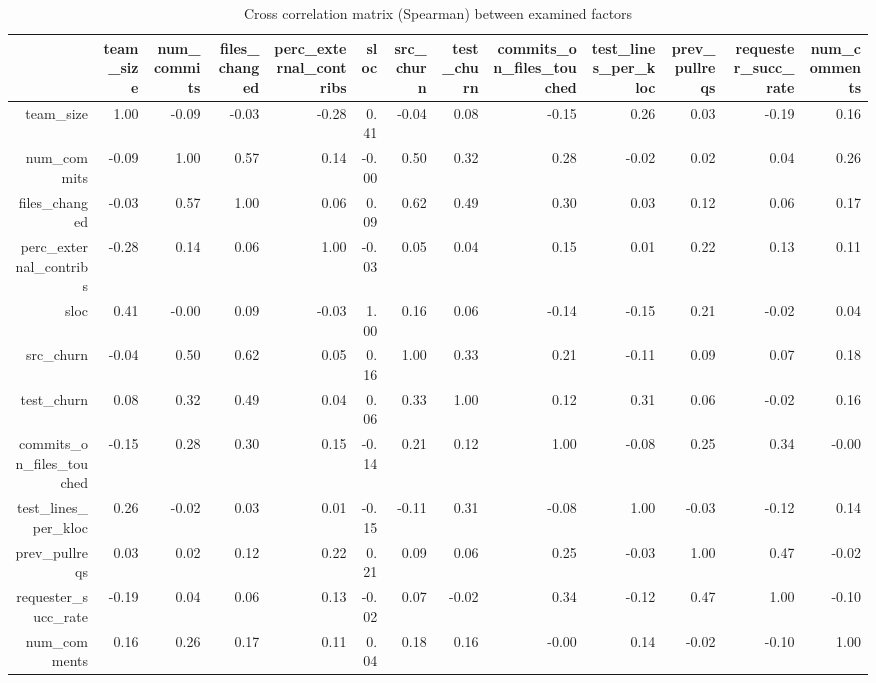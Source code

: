 \begin{table}[ht]
\centering
{\small
\begin{tabular}{rrrrrrrrrrrrr}
  \hline
 & team\_size & num\_commits & files\_changed & perc\_external\_contribs & sloc & src\_churn & test\_churn & commits\_on\_files\_touched & test\_lines\_per\_kloc & prev\_pullreqs & requester\_succ\_rate & num\_comments \\ 
  \hline
team\_size & 1.00 & -0.09 & -0.03 & -0.28 & 0.41 & -0.04 & 0.08 & -0.15 & 0.26 & 0.03 & -0.19 & 0.16 \\ 
  num\_commits & -0.09 & 1.00 & 0.57 & 0.14 & -0.00 & 0.50 & 0.32 & 0.28 & -0.02 & 0.02 & 0.04 & 0.26 \\ 
  files\_changed & -0.03 & 0.57 & 1.00 & 0.06 & 0.09 & 0.62 & 0.49 & 0.30 & 0.03 & 0.12 & 0.06 & 0.17 \\ 
  perc\_external\_contribs & -0.28 & 0.14 & 0.06 & 1.00 & -0.03 & 0.05 & 0.04 & 0.15 & 0.01 & 0.22 & 0.13 & 0.11 \\ 
  sloc & 0.41 & -0.00 & 0.09 & -0.03 & 1.00 & 0.16 & 0.06 & -0.14 & -0.15 & 0.21 & -0.02 & 0.04 \\ 
  src\_churn & -0.04 & 0.50 & 0.62 & 0.05 & 0.16 & 1.00 & 0.33 & 0.21 & -0.11 & 0.09 & 0.07 & 0.18 \\ 
  test\_churn & 0.08 & 0.32 & 0.49 & 0.04 & 0.06 & 0.33 & 1.00 & 0.12 & 0.31 & 0.06 & -0.02 & 0.16 \\ 
  commits\_on\_files\_touched & -0.15 & 0.28 & 0.30 & 0.15 & -0.14 & 0.21 & 0.12 & 1.00 & -0.08 & 0.25 & 0.34 & -0.00 \\ 
  test\_lines\_per\_kloc & 0.26 & -0.02 & 0.03 & 0.01 & -0.15 & -0.11 & 0.31 & -0.08 & 1.00 & -0.03 & -0.12 & 0.14 \\ 
  prev\_pullreqs & 0.03 & 0.02 & 0.12 & 0.22 & 0.21 & 0.09 & 0.06 & 0.25 & -0.03 & 1.00 & 0.47 & -0.02 \\ 
  requester\_succ\_rate & -0.19 & 0.04 & 0.06 & 0.13 & -0.02 & 0.07 & -0.02 & 0.34 & -0.12 & 0.47 & 1.00 & -0.10 \\ 
  num\_comments & 0.16 & 0.26 & 0.17 & 0.11 & 0.04 & 0.18 & 0.16 & -0.00 & 0.14 & -0.02 & -0.10 & 1.00 \\ 
   \hline
\end{tabular}
}
\caption{Cross correlation matrix (Spearman) between examined factors} 
\label{tab:crosscor}
\end{table}
